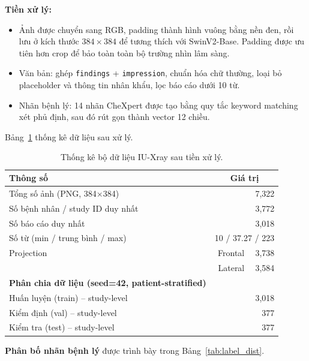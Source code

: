 \documentclass[12pt, a4paper]{article}
\begin{document}
\textbf{Tiền xử lý:}
\begin{itemize}
  \item Ảnh được chuyển sang RGB, padding thành hình vuông bằng nền đen, rồi
    lưu ở kích thước $384 \times 384$ để tương thích với SwinV2-Base.
    Padding được ưu tiên hơn crop để bảo toàn toàn bộ trường nhìn lâm sàng.
  \item Văn bản: ghép \texttt{findings} + \texttt{impression}, chuẩn hóa
    chữ thường, loại bỏ placeholder và thông tin nhân khẩu, lọc báo cáo
    dưới 10 từ.
  \item Nhãn bệnh lý: 14 nhãn CheXpert được tạo bằng quy tắc keyword matching
    xét phủ định, sau đó rút gọn thành vector 12 chiều.
\end{itemize}

Bảng~\ref{tab:dataset} thống kê dữ liệu sau xử lý.

\begin{table}[H]
  \centering
  \caption{Thống kê bộ dữ liệu IU-Xray sau tiền xử lý.}
  \label{tab:dataset}
  \begin{tabular}{lrr}
    \toprule
    \textbf{Thông số} & \multicolumn{2}{c}{\textbf{Giá trị}} \\
    \midrule
    Tổng số ảnh (PNG, 384$\times$384)    & \multicolumn{2}{r}{7,322} \\
    Số bệnh nhân / study ID duy nhất     & \multicolumn{2}{r}{3,772} \\
    Số báo cáo duy nhất                  & \multicolumn{2}{r}{3,018} \\
    Số từ (min / trung bình / max)       & \multicolumn{2}{r}{10 / 37.27 / 223} \\
    \midrule
    Projection & Frontal & 3,738 \\
               & Lateral & 3,584 \\
    \midrule
    \textbf{Phân chia dữ liệu (seed=42, patient-stratified)} & & \\
    Huấn luyện (train) -- study-level   & \multicolumn{2}{r}{3,018} \\
    Kiểm định (val) -- study-level      & \multicolumn{2}{r}{377}   \\
    Kiểm tra (test) -- study-level      & \multicolumn{2}{r}{377}   \\
    \bottomrule
  \end{tabular}
\end{table}

\textbf{Phân bố nhãn bệnh lý} được trình bày trong Bảng~\ref{tab:label_dist}.
\end{document}

